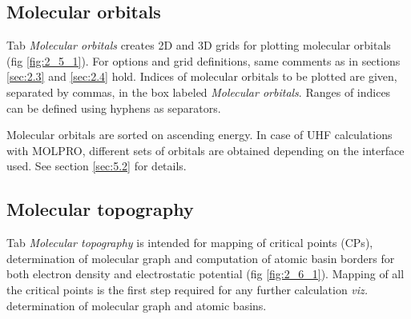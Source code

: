 \documentclass[10pt]{article}
\begin{document}
\subsection{Molecular orbitals \label{sec:2.5}}

Tab {\it Molecular orbitals} creates 
2D and 3D grids for plotting molecular orbitals (fig
\ref{fig:2_5_1}). For options and grid definitions, same comments as in sections
\ref{sec:2.3} and \ref{sec:2.4} hold. Indices of molecular orbitals to be
plotted are given, separated by commas, in the box labeled {\it Molecular
orbitals}. Ranges of indices can be defined using hyphens as separators.

Molecular orbitals are sorted on ascending energy. In case of UHF calculations with 
MOLPRO, different sets of orbitals are obtained depending on the interface used. See 
section \ref{sec:5.2} for details.


\subsection{Molecular topography \label{sec:2.6}}

Tab {\it Molecular topography}
is intended for mapping of critical points (CPs), 
determination of molecular graph and computation of 
atomic basin borders
for both electron density and electrostatic potential (fig \ref{fig:2_6_1}). Mapping of all the critical points is the 
first step required for any further calculation {\it viz.} determination of molecular graph and atomic basins.

\vspace*{10mm}
\end{document}
